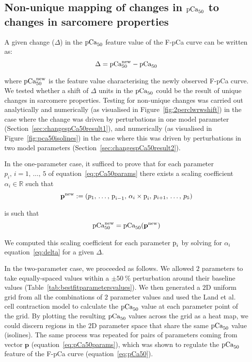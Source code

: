 %
%
%
\subsection{Non-unique mapping of changes in $\textrm{pCa}_{50}$ to changes in sarcomere properties}\label{sec:changespCa50}
A given change ($\Delta$) in the $\textrm{pCa}_{50}$ feature value of the F-pCa curve can be written as:
%
\begin{equation}\label{eq:delta}
    \Delta = \textrm{pCa}_{50}^{\text{new}} - \textrm{pCa}_{50}
\end{equation}

\vspace{0.2cm}\noindent
where $\textrm{pCa}_{50}^{\text{new}}$ is the feature value characterising the newly observed F-pCa curve. We tested whether a shift of $\Delta$ units in the $\textrm{pCa}_{50}$ could be the result of unique changes in sarcomere properties. Testing for non-unique changes was carried out analytically and numerically (as visualised in Figure~\ref{fig:2perclwrwshift}) in the case where the change was driven by perturbations in one model parameter (Section~\ref{sec:changespCa50result1}), and numerically (as visualised in Figure~\ref{fig:pca50isolines}) in the case where this was driven by perturbations in two model parameters (Section~\ref{sec:changespCa50result2}).

\vspace{0.2cm}
In the one-parameter case, it sufficed to prove that for each parameter $p_i,\,i=1,\,\dots,\,5$ of equation~\eqref{eq:pCa50params} there exists a scaling coefficient $\alpha_i\in\mathbb{R}$ such that
%
\begin{equation}
    \mathbf{p}^{\text{new}} := (p_1,\,\dots,\,\textrm{p}_{i-1},\,\alpha_i\times\textrm{p}_i,\,p_{i+1},\,\dots,\,p_5)
\end{equation}

\noindent
is such that
%
\begin{equation}
    \textrm{pCa}_{50}^{\text{new}} = \textrm{pCa}_{50}(\mathbf{p}^{\text{new}})
\end{equation}

\vspace{0.2cm}\noindent
We computed this scaling coefficient for each parameter $\textrm{p}_i$ by solving for $\alpha_i$ equation~\eqref{eq:delta} for a given $\Delta$.

\vspace{0.2cm}
In the two-parameter case, we proceeded as follows. We allowed $2$ parameters to take equally-spaced values within a $\pm\SI{50}{\percent}$ perturbation around their baseline values (Table~\ref{tab:bestfitparametersvalues}). We then generated a $2$D uniform grid from all the combinations of $2$ parameter values and used the Land et al.~\cite{Land:2012} cell contraction model to calculate the $\textrm{pCa}_{50}$ value at each parameter point of the grid. By plotting the resulting $\textrm{pCa}_{50}$ values across the grid as a heat map, we could discern regions in the $2$D parameter space that share the same $\textrm{pCa}_{50}$ value (isolines). The same process was repeated for pairs of parameters coming from vector $\mathbf{p}$ (equation~\eqref{eq:pCa50params}), which was shown to regulate the $\textrm{pCa}_{50}$ feature of the F-pCa curve (equation~\eqref{eq:pCa50}).


